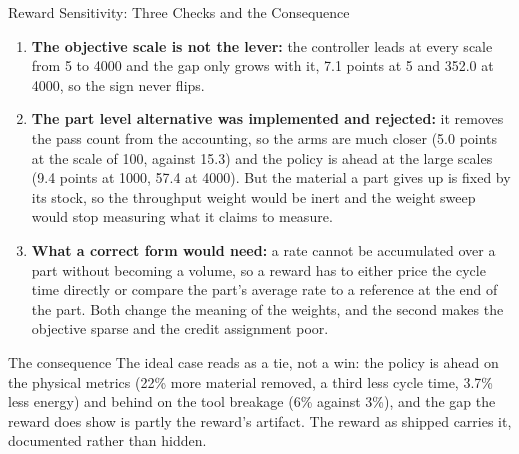 ﻿\documentclass[11pt,aspectratio=169]{beamer}
\begin{document}
\begin{frame}{Reward Sensitivity: Three Checks and the Consequence}
    \footnotesize
    \begin{enumerate}
        \item \textbf{The objective scale is not the lever:} the controller leads at every scale from 5
        to 4000 and the gap only grows with it, 7.1 points at 5 and 352.0 at 4000, so the sign never flips.
        \item \textbf{The part level alternative was implemented and rejected:} it removes the pass count
        from the accounting, so the arms are much closer (5.0 points at the scale of 100, against 15.3)
        and the policy is ahead at the large scales (9.4 points at 1000, 57.4 at 4000). But the material a
        part gives up is fixed by its stock, so the throughput weight would be inert and the weight sweep
        would stop measuring what it claims to measure.
        \item \textbf{What a correct form would need:} a rate cannot be accumulated over a part without
        becoming a volume, so a reward has to either price the cycle time directly or compare the part's
        average rate to a reference at the end of the part. Both change the meaning of the weights, and the
        second makes the objective sparse and the credit assignment poor.
    \end{enumerate}

    \vspace{0.1em}
    \begin{alertblock}{The consequence}
    \footnotesize
    The ideal case reads as a \alert{tie, not a win}: the policy is ahead on the physical metrics (22\%
    more material removed, a third less cycle time, 3.7\% less energy) and behind on the tool breakage
    (6\% against 3\%), and the gap the reward does show is partly the reward's artifact. The reward as
    shipped carries it, documented rather than hidden.
    \end{alertblock}
\end{frame}
\end{document}
